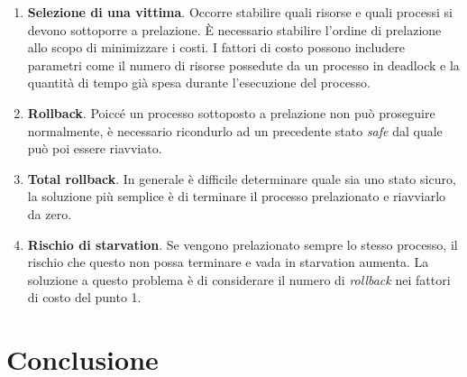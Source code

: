 \documentclass[a4paper,12pt, twoside]{report}
\begin{document}
\begin{enumerate}
\item \textbf{Selezione di una vittima}. Occorre stabilire quali risorse e quali processi si devono sottoporre a prelazione. \`E necessario stabilire l'ordine di prelazione allo scopo di minimizzare i costi. I fattori di costo possono includere parametri come il numero di risorse possedute da un processo in deadlock e la quantit\`a di tempo gi\`a spesa durante l'esecuzione del processo. 
\item \textbf{Rollback}. Poicc\'e un processo sottoposto a prelazione non pu\`o proseguire normalmente, \`e necessario ricondurlo ad un precedente stato \emph{safe} dal quale pu\`o poi essere riavviato. 
\item \textbf{Total rollback}. In generale \`e difficile determinare quale sia uno stato sicuro, la soluzione pi\`u semplice \`e di terminare il processo prelazionato e riavviarlo da zero.
\item \textbf{Rischio di starvation}. Se vengono prelazionato sempre lo stesso processo, il rischio che questo non possa terminare e vada in starvation aumenta. La soluzione a questo problema \`e di considerare il numero di \emph{rollback} nei fattori di costo del punto 1.
\end{enumerate}


\section{Conclusione}
\end{document}
